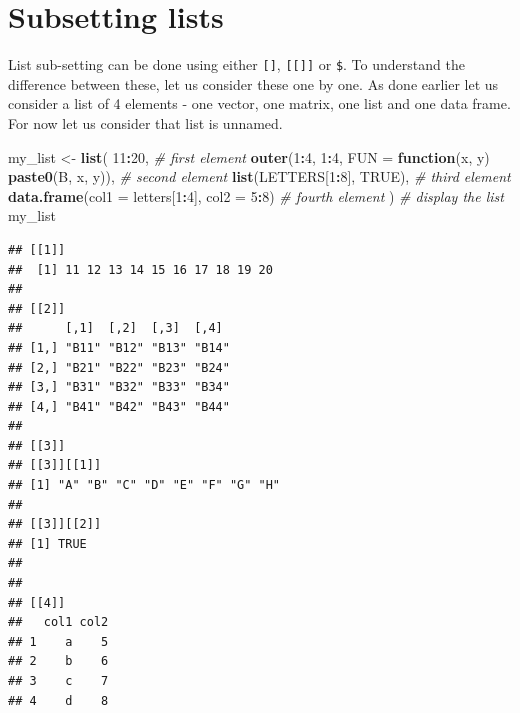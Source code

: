 \documentclass[
]{book}
\newenvironment{Shaded}{\begin{snugshade}}{\end{snugshade}}
\newcommand{\AttributeTok}[1]{\textcolor[rgb]{0.13,0.29,0.53}{#1}}
\newcommand{\CommentTok}[1]{\textcolor[rgb]{0.56,0.35,0.01}{\textit{#1}}}
\newcommand{\ConstantTok}[1]{\textcolor[rgb]{0.56,0.35,0.01}{#1}}
\newcommand{\ControlFlowTok}[1]{\textcolor[rgb]{0.13,0.29,0.53}{\textbf{#1}}}
\newcommand{\DecValTok}[1]{\textcolor[rgb]{0.00,0.00,0.81}{#1}}
\newcommand{\FunctionTok}[1]{\textcolor[rgb]{0.13,0.29,0.53}{\textbf{#1}}}
\newcommand{\NormalTok}[1]{#1}
\newcommand{\OtherTok}[1]{\textcolor[rgb]{0.56,0.35,0.01}{#1}}
\newcommand{\SpecialCharTok}[1]{\textcolor[rgb]{0.81,0.36,0.00}{\textbf{#1}}}
\newcommand{\StringTok}[1]{\textcolor[rgb]{0.31,0.60,0.02}{#1}}
\begin{document}
\hypertarget{subsetting-lists}{%
\section{Subsetting lists}\label{subsetting-lists}}

List sub-setting can be done using either \texttt{{[}{]}}, \texttt{{[}{[}{]}{]}} or \texttt{\$}. To understand the difference between these, let us consider these one by one. As done earlier let us consider a list of 4 elements - one vector, one matrix, one list and one data frame. For now let us consider that list is unnamed.

\begin{Shaded}
\begin{Highlighting}[]
\NormalTok{my\_list }\OtherTok{\textless{}{-}} \FunctionTok{list}\NormalTok{(}
  \DecValTok{11}\SpecialCharTok{:}\DecValTok{20}\NormalTok{,                                                       }\CommentTok{\# first element}
  \FunctionTok{outer}\NormalTok{(}\DecValTok{1}\SpecialCharTok{:}\DecValTok{4}\NormalTok{, }\DecValTok{1}\SpecialCharTok{:}\DecValTok{4}\NormalTok{, }\AttributeTok{FUN =} \ControlFlowTok{function}\NormalTok{(x, y) }\FunctionTok{paste0}\NormalTok{(}\StringTok{\textquotesingle{}B\textquotesingle{}}\NormalTok{, x, y)),     }\CommentTok{\# second element}
  \FunctionTok{list}\NormalTok{(LETTERS[}\DecValTok{1}\SpecialCharTok{:}\DecValTok{8}\NormalTok{], }\ConstantTok{TRUE}\NormalTok{),                                    }\CommentTok{\# third element  }
  \FunctionTok{data.frame}\NormalTok{(}\AttributeTok{col1 =}\NormalTok{ letters[}\DecValTok{1}\SpecialCharTok{:}\DecValTok{4}\NormalTok{], }\AttributeTok{col2 =} \DecValTok{5}\SpecialCharTok{:}\DecValTok{8}\NormalTok{)                  }\CommentTok{\# fourth element}
\NormalTok{)}
\CommentTok{\# display the list}
\NormalTok{my\_list}
\end{Highlighting}
\end{Shaded}

\begin{verbatim}
## [[1]]
##  [1] 11 12 13 14 15 16 17 18 19 20
## 
## [[2]]
##      [,1]  [,2]  [,3]  [,4] 
## [1,] "B11" "B12" "B13" "B14"
## [2,] "B21" "B22" "B23" "B24"
## [3,] "B31" "B32" "B33" "B34"
## [4,] "B41" "B42" "B43" "B44"
## 
## [[3]]
## [[3]][[1]]
## [1] "A" "B" "C" "D" "E" "F" "G" "H"
## 
## [[3]][[2]]
## [1] TRUE
## 
## 
## [[4]]
##   col1 col2
## 1    a    5
## 2    b    6
## 3    c    7
## 4    d    8
\end{verbatim}
\end{document}
